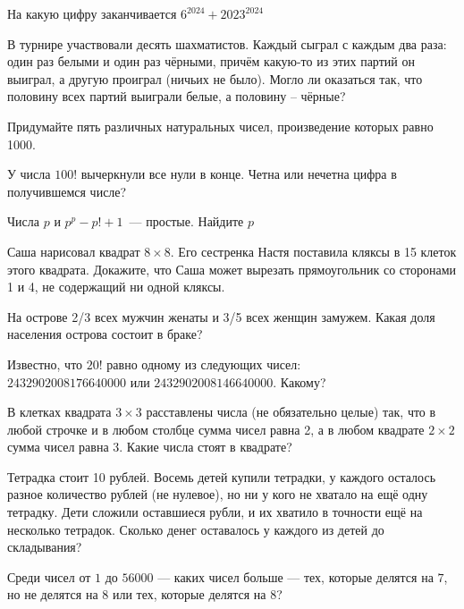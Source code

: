 \documentclass{article}
\begin{document}
\begin{enumerate_boxed}
        \item На какую цифру заканчивается $6^{2024} + 2023^{2024}$

        \item В турнире участвовали десять шахматистов.
        Каждый сыграл с каждым два раза: один раз белыми и один раз чёрными, причём какую-то из этих партий он выиграл, а другую проиграл (ничьих не было).
        Могло ли оказаться так, что половину всех партий выиграли белые, а половину – чёрные?

        \item Придумайте пять различных натуральных чисел, произведение которых равно 1000.

        \item У числа $100!$ вычеркнули все нули в конце.
        Четна или нечетна цифра в получившемся числе?

        \item Числа $p$ и $p^p - p! + 1$~--- простые.
        Найдите $p$

        \item Саша нарисовал квадрат $8\times 8$.
        Его сестренка Настя поставила кляксы в 15 клеток этого квадрата.
        Докажите, что Саша может вырезать прямоугольник со сторонами 1 и 4, не содержащий ни одной кляксы.

        \item На острове 2/3 всех мужчин женаты и 3/5 всех женщин замужем.
        Какая доля населения острова состоит в браке?

        \item Известно, что $20!$ равно одному из следующих чисел: \\
        $2432902008176640000$ или $2432902008146640000$.
        Какому?

        \item В клетках квадрата $3 \times 3$ расставлены числа (не обязательно целые) так, что в любой строчке и в любом столбце сумма чисел равна 2, а в любом квадрате $2 \times 2$ сумма чисел равна 3.
        Какие числа стоят в квадрате?

        \item Тетрадка стоит 10 рублей.
        Восемь детей купили тетрадки, у каждого осталось разное количество рублей (не нулевое), но ни у кого не хватало на ещё одну
        тетрадку.
        Дети сложили оставшиеся рубли, и их хватило в точности ещё на несколько тетрадок.
        Сколько денег оставалось у каждого из детей до складывания?

        \item Среди чисел от $1$ до $56 000$ — каких чисел больше —
        тех, которые делятся на $7$, но не делятся на $8$ или тех, которые делятся на $8$?


\end{enumerate_boxed}
\end{document}
